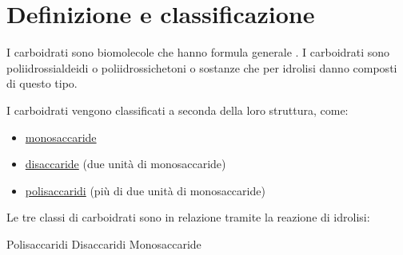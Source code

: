 \section{Definizione e classificazione}
I carboidrati sono biomolecole che hanno formula generale . I carboidrati sono poliidrossialdeidi o poliidrossichetoni o sostanze che per idrolisi danno composti di questo tipo.

I carboidrati vengono classificati a seconda della loro struttura, come:
\begin{itemize}
	\item \hyperref[sec:monosaccardi]{monosaccaride}
	\item \hyperref[sec:disaccaridi]{disaccaride} (due unità di monosaccaride)
	\item \hyperref[sec:polisaccaridi]{polisaccaridi} (più di due unità di monosaccaride)
\end{itemize}
Le tre classi di carboidrati sono in relazione tramite la reazione di idrolisi:
\begin{reaction*}
	Polisaccaridi \arrow{->[\ch{H2O}][\Hpiu{1}]}
	Disaccaridi \arrow{->[\ch{H2O}][\Hpiu{1}]}
	Monosaccaride
\end{reaction*}

